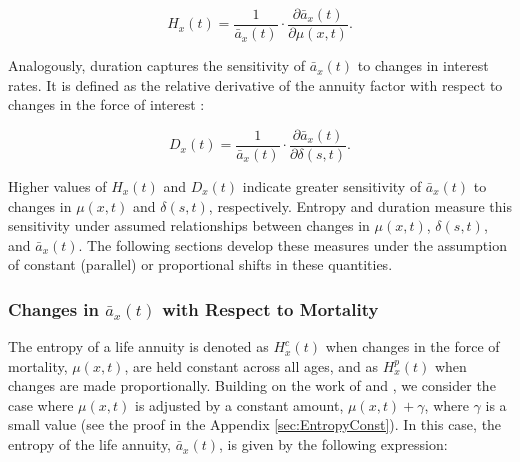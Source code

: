 \documentclass[12pt]{article}
\begin{document}
\begin{equation}\label{eq:EntropyGeneral}
{H}_{x}(t) = \frac{ 1}{\bar{a}_x(t)}\cdot \frac{\partial \bar{a}_x(t) }{\partial \mu(x,t)}.
\end{equation}

Analogously, duration captures the sensitivity of $\bar{a}_x(t)$ to changes in interest rates. It is defined as the relative derivative of the annuity factor with respect to changes in the force of interest \citep{Milevsky2012,Milevsky2012a}:


\begin{equation}\label{eq:DurationGeneral}
{D}_{x}(t) = \frac{1}{\bar{a}_x(t)}\cdot  \frac{\partial \bar{a}_x(t) }{\partial \delta(s,t)}.
\end{equation}


Higher values of ${H}_{x}(t)$ and ${D}_{x}(t)$ indicate greater sensitivity of $\bar{a}_x(t)$ to changes in $\mu(x,t)$ and $\delta(s,t)$, respectively. Entropy and duration measure this sensitivity under assumed relationships between changes in $\mu(x,t)$, $\delta(s,t)$, and $\bar{a}_x(t)$. The following sections develop these measures under the assumption of constant (parallel) or proportional shifts in these quantities.

\subsubsection{Changes in $\bar{a}_x(t)$ with Respect to Mortality}


The entropy of a life annuity is denoted as ${H}^{c}_{x}(t)$ when changes in the force of mortality, $\mu(x,t)$, are held constant across all ages, and as ${H}^{p}_{x}(t)$ when changes are made proportionally. Building on the work of \citet{Tsai2013a} and \citet{Lin2020}, we consider the case where $\mu(x,t)$ is adjusted by a constant amount, $\mu(x,t) + \gamma$, where $\gamma$ is a small value (see the proof in the Appendix \ref{sec:EntropyConst}). In this case, the entropy of the life annuity, $\bar{a}_x(t)$, is given by the following expression:
\end{document}
